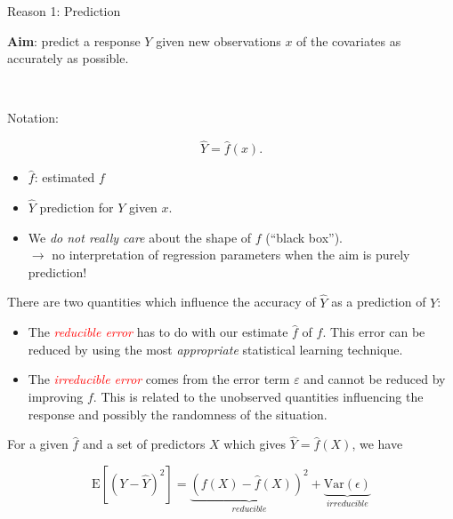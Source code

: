 \documentclass[
  ignorenonframetext,
]{beamer}
\providecommand{\tightlist}{%
  \setlength{\itemsep}{0pt}\setlength{\parskip}{0pt}}
\begin{document}
\begin{frame}
\begin{block}{Reason 1: Prediction}
\protect\hypertarget{reason-1-prediction}{}
\(~\)

\textbf{Aim}: predict a response \(Y\) given new observations \(x\) of
the covariates as accurately as possible.

\(~\)

Notation:

\[\hat{Y} = \hat{f}(x).\]

\begin{itemize}
\item
  \(\hat{f}\): estimated \(f\)
\item
  \(\hat{Y}\) prediction for \(Y\) given \(x\).
\end{itemize}

\vspace{2mm}

\begin{itemize}
\tightlist
\item
  We \emph{do not really care} about the shape of \(f\) (``black
  box'').\\
  \(\rightarrow\) no interpretation of regression parameters when the
  aim is purely prediction!
\end{itemize}
\end{block}
\end{frame}

\begin{frame}
There are two quantities which influence the accuracy of \(\hat{Y}\) as
a prediction of \(Y\):

\begin{itemize}
\tightlist
\item
  The \emph{\textcolor{red}{reducible error}} has to do with our
  estimate \(\hat{f}\) of \(f\). This error can be reduced by using the
  most \emph{appropriate} statistical learning technique.
\item
  The \emph{\textcolor{red}{irreducible error}} comes from the error
  term \(\varepsilon\) and cannot be reduced by improving \(f\). This is
  related to the unobserved quantities influencing the response and
  possibly the randomness of the situation.
\end{itemize}

For a given \(\hat{f}\) and a set of predictors \(X\) which gives
\(\hat{Y}=\hat{f}(X)\), we have

\[\text{E}[(Y-\hat{Y})^2] = \underbrace{(f(X)-\hat{f}(X))^2}_{reducible} + \underbrace{\text{Var}(\epsilon)}_{irreducible}\]
\end{frame}
\end{document}
